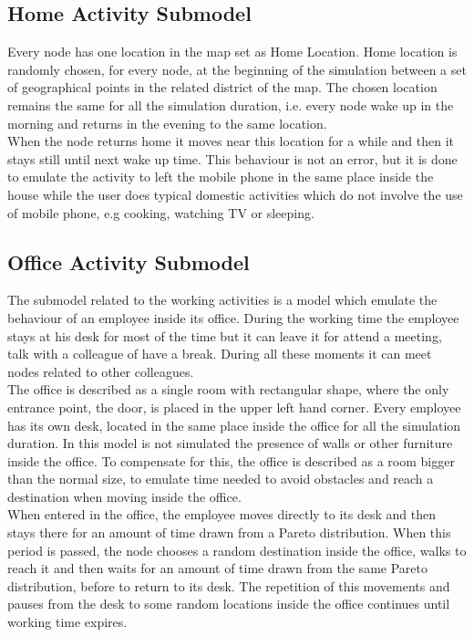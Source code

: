 \subsection{Home Activity Submodel}
Every node has one location in the map set as Home Location. Home location is randomly chosen, for every node, at the beginning of the simulation between a set of geographical points in the related district of the map. The chosen location remains the same for all the simulation duration, i.e. every node wake up in the morning and returns in the evening to the same location.
\\

When the node returns home it moves near this location for a while and then it stays still until next wake up time. This behaviour is not an error, but it is done to emulate the activity to left the mobile phone in the same place inside the house while the user does typical domestic activities which do not involve the use of mobile phone, e.g cooking, watching TV or sleeping.

\subsection{Office Activity Submodel}
The submodel related to the working activities is a model which emulate the behaviour of an employee inside its office. During the working time the employee stays at his desk for most of the time but it can leave it for attend a meeting, talk with a colleague of have a break. During all these moments it can meet nodes related to other colleagues.
\\

The office is described as a single room with rectangular shape, where the only entrance point, the door, is placed in the upper left hand corner. Every employee has its own desk, located in the same place inside the office for all the simulation duration. In this model is not simulated the presence of walls or other furniture inside the office. To compensate for this, the office is described as a room bigger than the normal size, to emulate time needed to avoid obstacles and reach a destination when moving inside the office.
\\

When entered in the office, the employee moves directly to its desk and then stays there for an amount of time drawn from a Pareto distribution. When this period is passed, the node chooses a random destination inside the office, walks to reach it and then waits for an amount of time drawn from the same Pareto distribution, before to return to its desk. The repetition of this movements and pauses from the desk to some random locations inside the office continues until working time expires. 
\\

